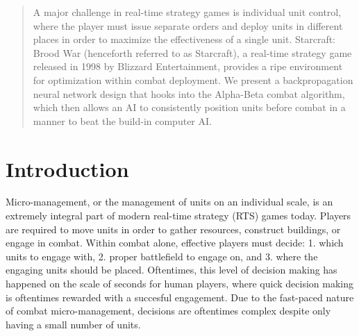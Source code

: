 \documentclass[twocolumn]{article}
\begin{document}

\begin{abstract}
A major challenge in real-time strategy games is individual unit control, where the player must issue separate orders and deploy units in different places in order to maximize the effectiveness of a single unit. Starcraft: Brood War (henceforth referred to as Starcraft), a real-time strategy game released in 1998 by Blizzard Entertainment, provides a ripe environment for optimization within combat deployment. We present a backpropagation neural network design that hooks into the Alpha-Beta combat algorithm, which then allows an AI to consistently position units before combat in a manner to beat the build-in computer AI. 
\end{abstract}

\section{Introduction}
Micro-management, or the management of units on an individual scale, is an extremely integral part of modern real-time strategy (RTS) games today. Players are required to move units in order to gather resources, construct buildings, or engage in combat. Within combat alone, effective players must decide: 1. which units to engage with, 2. proper battlefield to engage on, and 3. where the engaging units should be placed. Oftentimes, this level of decision making has happened on the scale of seconds for human players, where quick decision making is oftentimes rewarded with a succesful engagement. Due to the fast-paced nature of combat micro-management, decisions are oftentimes complex despite only having a small number of units. 
\end{document}
